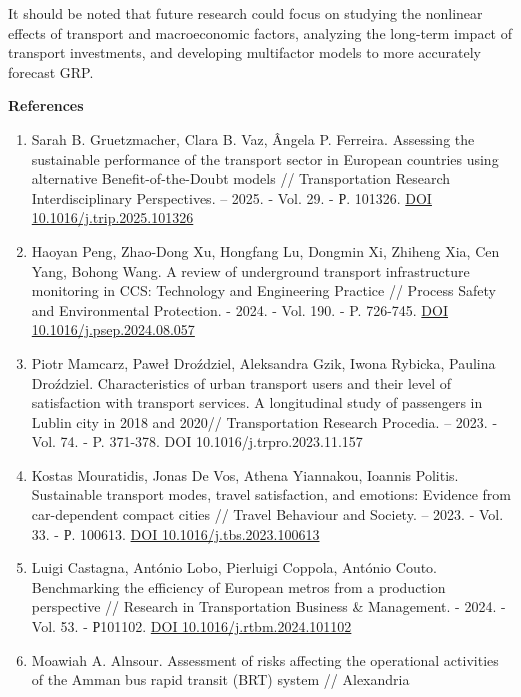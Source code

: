 It should be noted that future research could focus on studying the
nonlinear effects of transport and macroeconomic factors, analyzing the
long-term impact of transport investments, and developing multifactor
models to more accurately forecast GRP.

{\bfseries References}

\begin{enumerate}
\def\labelenumi{\arabic{enumi}.}
\item
  Sarah B. Gruetzmacher, Clara B. Vaz, Ângela P. Ferreira. Assessing the
  sustainable performance of the transport sector in European countries
  using alternative Benefit-of-the-Doubt models // Transportation
  Research Interdisciplinary Perspectives. -- 2025. - Vol. 29. - Р.
  101326. \href{https://doi.org/10.1016/j.trip.2025.101326}{DOI
  10.1016/j.trip.2025.101326}
\item
  Haoyan Peng, Zhao-Dong Xu, Hongfang Lu, Dongmin Xi, Zhiheng Xia, Cen
  Yang, Bohong Wang. A review of underground transport infrastructure
  monitoring in CCS: Technology and Engineering Practice // Process
  Safety and Environmental Protection. - 2024. - Vol. 190. - P. 726-745.
  \href{https://doi.org/10.1016/j.psep.2024.08.057}{DOI
  10.1016/j.psep.2024.08.057}
\item
  Piotr Mamcarz, Paweł Droździel, Aleksandra Gzik, Iwona Rybicka,
  Paulina Droździel. Characteristics of urban transport users and their
  level of satisfaction with transport services. A longitudinal study of
  passengers in Lublin city in 2018 and 2020// Transportation Research
  Procedia. -- 2023. - Vol. 74. - P. 371-378. DOI
  10.1016/j.trpro.2023.11.157
\item
  Kostas Mouratidis, Jonas De Vos, Athena Yiannakou, Ioannis Politis.
  Sustainable transport modes, travel satisfaction, and emotions:
  Evidence from car-dependent compact cities // Travel Behaviour and
  Society. -- 2023. - Vol. 33. - Р. 100613.
  \href{https://doi.org/10.1016/j.tbs.2023.100613}{DOI
  10.1016/j.tbs.2023.100613}
\item
  Luigi Castagna, António Lobo, Pierluigi Coppola, António Couto.
  Benchmarking the efficiency of European metros from a production
  perspective // Research in Transportation Business \& Management. -
  2024. - Vol. 53. - Р101102.
  \href{https://doi.org/10.1016/j.rtbm.2024.101102}{DOI
  10.1016/j.rtbm.2024.101102}
\item
  Moawiah A. Alnsour. Assessment of risks affecting the operational
  activities of the Amman bus rapid transit (BRT) system // Alexandria

\end{enumerate}
